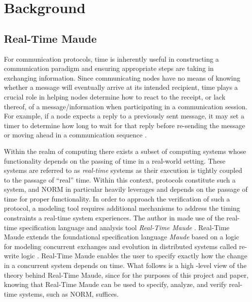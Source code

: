 \documentclass[10pt, journal]{IEEEtran}
\begin{document}
\section{Background}

\subsection{Real-Time Maude}

For communication protocols, time is inherently useful in constructing a communication paradigm and ensuring appropriate steps are taking in exchanging information. Since communicating nodes have no means of knowing whether a message will eventually arrive at its intended recipient, time plays a crucial role in helping nodes determine how to react to the receipt, or lack thereof, of a message/information when participating in a communication session. For example, if a node expects a reply to a previously sent message, it may set a timer to determine how long to wait for that reply before re-sending the message or moving ahead in a communication sequence \cite{Lien2004}.

Within the realm of computing there exists a subset of computing systems whose functionality depends on the passing of time in a real-world setting. These systems are referred to as \textit{real-time} systems as their execution is tightly coupled to the passage of ``real'' time. Within this context, protocols constitute such a system, and NORM in particular heavily leverages and depends on the passage of time for proper functionality. In order to approach the verification of such a protocol, a modeling tool requires additional mechanisms to address the timing constraints a real-time system experiences. The author in \cite{Lien2004} made use of the real-time specification language and analysis tool \textit{Real-Time Maude} \cite{rtmaudeUrl, Olvezky2004}. Real-Time Maude extends the foundational specification language \textit{Maude} \cite{maudeUrl, Clavel2002} based on a logic for modeling concurrent exchanges and evolution in distributed systems called re-write logic \cite{Meseguer1992}. Real-Time Maude enables the user to specify exactly how the change in a concurrent system depends on time. What follows is a high -level view of the theory behind Real-Time Maude, since for the purposes of this project and paper, knowing that Real-Time Maude can be used to specify, analyze, and verify real-time systems, such as NORM, suffices.
\end{document}
